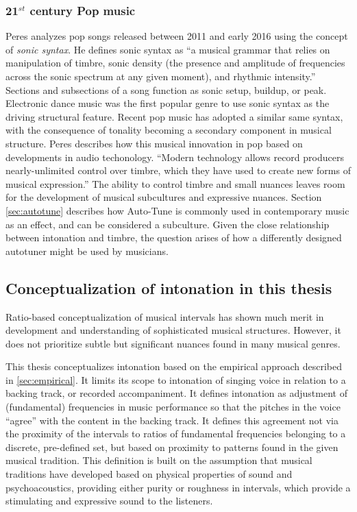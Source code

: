\subsubsection{21$^{st}$ century Pop music}
Peres analyzes pop songs released between 2011 and early 2016 using the concept of \textit{sonic syntax}. He defines sonic syntax as ``a musical grammar that relies on manipulation of timbre, sonic
density (the presence and amplitude of frequencies across the sonic spectrum at any given
moment), and rhythmic intensity.'' \cite[][p.~2]{peres2016sonic} Sections and subsections of a song function as sonic setup, buildup, or peak. Electronic dance music was the first popular genre to use sonic syntax as the driving structural feature. Recent pop music has adopted a similar same syntax, with the consequence of tonality becoming a secondary component in musical structure. Peres describes how this musical innovation in pop based on developments in audio techonology. ``Modern technology allows record producers nearly-unlimited control over timbre, which they have used to create new forms of musical expression.'' \cite[][p.~36]{peres2016sonic} The ability to control timbre and small nuances leaves room for the development of musical subcultures and expressive nuances. Section \ref{sec:autotune} describes how Auto-Tune is commonly used in contemporary music as an effect, and can be considered a subculture. Given the close relationship between intonation and timbre, the question arises of how a differently designed autotuner might be used by musicians.

\subsection{Conceptualization of intonation in this thesis}
Ratio-based conceptualization of musical intervals has shown much merit in development and understanding of sophisticated musical structures. However, it does not prioritize subtle but significant nuances found in many musical genres. 

This thesis conceptualizes intonation based on the empirical approach described in \ref{sec:empirical}. It limits its scope to intonation of singing voice in relation to a backing track, or recorded accompaniment. It defines intonation as adjustment of (fundamental) frequencies in music performance so that the pitches in the voice ``agree'' with the content in the backing track. It defines this agreement not via the proximity of the intervals to ratios of fundamental frequencies belonging to a discrete, pre-defined set, but based on proximity to patterns found in the given musical tradition. This definition is built on the assumption that musical traditions have developed based on physical properties of sound and psychoacoustics, providing either purity or roughness in intervals, which provide a stimulating and expressive sound to the listeners. 

